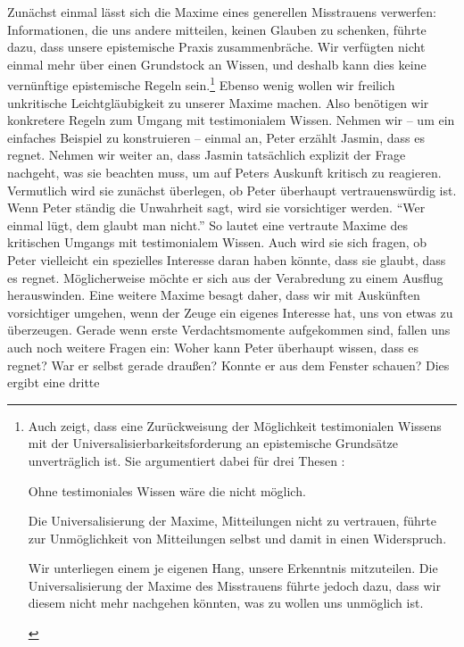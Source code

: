 Zunächst einmal lässt sich die Maxime eines generellen Misstrauens verwerfen:
Informationen, die uns andere mitteilen, keinen Glauben zu schenken, führte
dazu, dass unsere epistemische Praxis zusammenbräche. Wir verfügten nicht einmal
mehr über einen Grundstock an Wissen, und deshalb kann dies keine vernünftige
epistemische Regeln sein.\footnote{Auch  zeigt,
dass eine Zurückweisung der Möglichkeit testimonialen Wissens mit der
Universalisierbarkeitsforderung an epistemische Grundsätze unverträglich ist.
Sie argumentiert dabei für drei Thesen
\parencite[vgl.][326--328]{Cohen:KantontheEthicsofBelief2014}:
\begin{nummerierung}
\item Ohne testimoniales Wissen wäre die 
nicht möglich.
\item Die Universalisierung der Maxime, Mitteilungen nicht zu vertrauen, führte
zur Unmöglichkeit von Mitteilungen selbst und damit in einen Widerspruch.
\item Wir unterliegen einem je eigenen Hang, unsere Erkenntnis mitzuteilen. Die
Universalisierung der Maxime des Misstrauens führte jedoch dazu, dass wir diesem
nicht mehr nachgehen könnten, was zu wollen uns unmöglich ist.
\end{nummerierung}} Ebenso wenig wollen wir freilich unkritische Leichtgläubigkeit zu unserer
Maxime machen. Also benötigen wir konkretere Regeln zum Umgang mit testimonialem
Wissen. Nehmen wir -- um ein einfaches Beispiel zu konstruieren -- einmal an,
Peter erzählt Jasmin, dass es regnet. Nehmen wir weiter an, dass Jasmin
tatsächlich explizit der Frage nachgeht, was sie beachten muss, um auf Peters
Auskunft kritisch zu reagieren. Vermutlich wird sie zunächst überlegen, ob Peter
überhaupt vertrauenswürdig ist. Wenn Peter ständig
die Unwahrheit sagt, wird sie vorsichtiger werden. \enquote{Wer einmal lügt, dem
glaubt man nicht.} So lautet eine vertraute Maxime des kritischen Umgangs mit
testimonialem Wissen. Auch wird sie sich fragen, ob Peter vielleicht ein
spezielles Interesse daran haben könnte, dass sie glaubt, dass es regnet.
Möglicherweise möchte er sich aus der Verabredung zu einem Ausflug herauswinden.
Eine weitere Maxime besagt daher, dass wir mit Auskünften vorsichtiger umgehen,
wenn der Zeuge ein eigenes Interesse hat, uns von etwas zu überzeugen. Gerade
wenn erste Verdachtsmomente aufgekommen sind, fallen uns auch noch weitere
Fragen ein: Woher kann Peter überhaupt wissen, dass es regnet? War er selbst
gerade draußen? Konnte er aus dem Fenster schauen? Dies ergibt eine dritte
